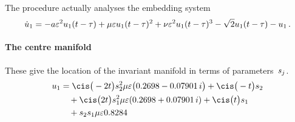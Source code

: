 The procedure actually analyses the embedding system
\begin{equation*}
\dot u_{1}=-a \varepsilon^{2} u_1(t-\tau)
+\mu  \varepsilon  u_1(t-\tau)^{2}
+\nu  \varepsilon^{2} u_1(t-\tau)^{3}
-\sqrt {2} u_1(t-\tau)-u\sb1
\,.
\end{equation*}

\paragraph{The centre manifold} 
These give the location of the invariant manifold in
terms of parameters~\(s\sb j\).
\begin{align*}&
u_{1}=\cis\big(-2 t\big) s_{2}^{2} \mu  \eps \big(0.2698 - 0.07901\,i\big)+\cis\big(-t\big) s_{2}
\\&\qquad{}
+\cis\big(2 t\big) s_{1}^{2} \mu  \eps (0.2698 + 0.07901\,i)+
\cis\big(t\big) s_{1}
\\&\qquad{}
+s_{2} s_{1} \mu  \eps 0.8284
\end{align*}
 
